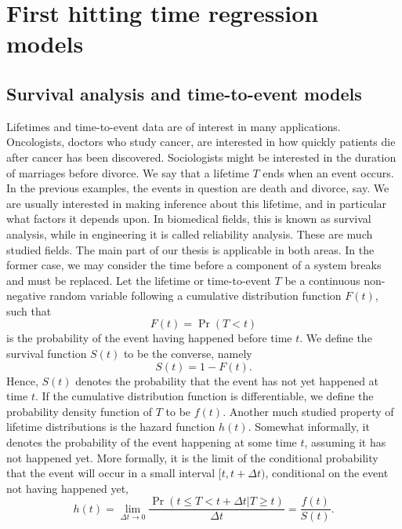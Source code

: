 \chapter{First hitting time regression models}

\section{Survival analysis and time-to-event models}\label{sec:survival}
Lifetimes and time-to-event data are of interest in many applications. Oncologists, doctors who study cancer, are interested in how quickly patients die after cancer has been discovered. Sociologists might be interested in the duration of marriages before divorce. We say that a lifetime $T$ ends when an event occurs. In the previous examples, the events in question are death and divorce, say. We are usually interested in making inference about this lifetime, and in particular what factors it depends upon. In biomedical fields, this is known as survival analysis, while in engineering it is called reliability analysis. These are much studied fields. The main part of our thesis is applicable in both areas. In the former case, we may consider the time before a component of a system breaks and must be replaced. Let the lifetime or time-to-event $T$ be a continuous non-negative random variable following a cumulative distribution function $F(t)$, such that
\begin{equation*}%
    F(t)=\Pr(T<t)
\end{equation*}
is the probability of the event having happened before time $t$. We define the survival function $S(t)$ to be the converse, namely
\begin{equation*}%
    S(t)=1-F(t).
\end{equation*}
Hence, $S(t)$ denotes the probability that the event has not yet happened at time $t$. If the cumulative distribution function is differentiable, we define the probability density function of $T$ to be $f(t)$. Another much studied property of lifetime distributions is the hazard function $h(t)$. Somewhat informally, it denotes the probability of the event happening at some time $t$, assuming it has not happened yet. More formally, it is the limit of the conditional probability that the event will occur in a small interval $[t,t+\Delta t)$, conditional on the event not having happened yet,
\begin{equation*}%
    h(t)=\lim_{\Delta t\to 0}\frac{\Pr(t\leq T<t+\Delta t|T\geq t)}{\Delta t}=\frac{f(t)}{S(t)}.
\end{equation*}
